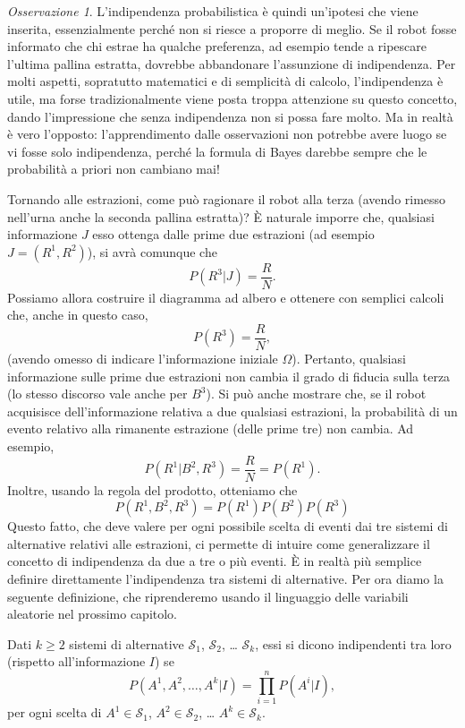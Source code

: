 \documentclass[
  italian,
  letterpaper,
]{book}
\theoremstyle{definition}
\theoremstyle{remark}
\newtheorem*{remark}{Osservazione}
\begin{document}
\begin{remark}
L'indipendenza probabilistica è quindi un'ipotesi che viene inserita,
essenzialmente perché non si riesce a proporre di meglio. Se il robot
fosse informato che chi estrae ha qualche preferenza, ad esempio tende a
ripescare l'ultima pallina estratta, dovrebbe abbandonare l'assunzione
di indipendenza. Per molti aspetti, sopratutto matematici e di
semplicità di calcolo, l'indipendenza è utile, ma forse tradizionalmente
viene posta troppa attenzione su questo concetto, dando l'impressione
che senza indipendenza non si possa fare molto. Ma in realtà è vero
l'opposto: l'apprendimento dalle osservazioni non potrebbe avere luogo
se vi fosse solo indipendenza, perché la formula di Bayes darebbe sempre
che le probabilità a priori non cambiano mai!
\end{remark}

Tornando alle estrazioni, come può ragionare il robot alla terza (avendo
rimesso nell'urna anche la seconda pallina estratta)? È naturale imporre
che, qualsiasi informazione \(J\) esso ottenga dalle prime due
estrazioni (ad esempio \(J = (R^1, R^2)\)), si avrà comunque che
\[ P(R^3 | J) = \frac{R}{N}.\] Possiamo allora costruire il diagramma ad
albero e ottenere con semplici calcoli che, anche in questo caso,
\[ P(R^3 ) = \frac R N,\] (avendo omesso di indicare l'informazione
iniziale \(\Omega\)). Pertanto, qualsiasi informazione sulle prime due
estrazioni non cambia il grado di fiducia sulla terza (lo stesso
discorso vale anche per \(B^3\)). Si può anche mostrare che, se il robot
acquisisce dell'informazione relativa a due qualsiasi estrazioni, la
probabilità di un evento relativo alla rimanente estrazione (delle prime
tre) non cambia. Ad esempio,
\[ P(R^1 | B^2, R^3) = \frac{R}{N} = P(R^1).\] Inoltre, usando la regola
del prodotto, otteniamo che
\[ P(R^1, B^2, R^3) = P(R^1) P(B^2 ) P(R^3 )\] Questo fatto, che deve
valere per ogni possibile scelta di eventi dai tre sistemi di
alternative relativi alle estrazioni, ci permette di intuire come
generalizzare il concetto di indipendenza da due a tre o più eventi. È
in realtà più semplice definire direttamente l'indipendenza tra sistemi
di alternative. Per ora diamo la seguente definizione, che riprenderemo
usando il linguaggio delle variabili aleatorie nel prossimo capitolo.

Dati \(k \ge 2\) sistemi di alternative \(\mathcal{S}_1\),
\(\mathcal{S}_2\), \ldots{} \(\mathcal{S}_k\), essi si dicono
indipendenti tra loro (rispetto all'informazione \(I\)) se
\[ P( A^1, A^2, \ldots, A^k | I) = \prod_{i=1}^n P(A^i|I), \] per ogni
scelta di \(A^1 \in \mathcal{S}_1\), \(A^2 \in \mathcal{S}_2\), \ldots{}
\(A^k \in \mathcal{S}_k\).
\end{document}
